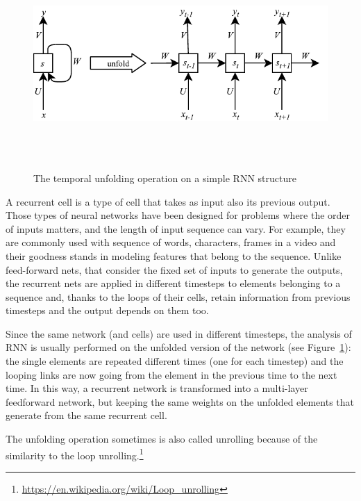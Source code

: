 \begin{figure}[!htbp]
    \centering
    \includegraphics[max width=\linewidth,max height=8cm,keepaspectratio]{figures/rnnUnfold}
    \caption{The temporal unfolding operation on a simple RNN structure}\label{fig:rnnUnfold}
\end{figure}

A recurrent cell is a type of cell that takes as input also its previous output. Those types of neural networks have been designed for problems where the order of inputs matters, and the length of input sequence can vary. For example, they are commonly used with sequence of words, characters, frames in a video and their goodness stands in modeling features that belong to the sequence. Unlike feed-forward nets, that consider the fixed set of inputs to generate the outputs, the recurrent nets are applied in different timesteps to elements belonging to a sequence and, thanks to the loops of their cells, retain information from previous timesteps and the output depends on them too.

Since the same network (and cells) are used in different timesteps, the analysis of RNN is usually performed on the unfolded version of the network (see Figure~\ref{fig:rnnUnfold}): the single elements are repeated different times (one for each timestep) and the looping links are now going from the element in the previous time to the next time. In this way, a recurrent network is transformed into a multi-layer feedforward network, but keeping the same weights on the unfolded elements that generate from the same recurrent cell.

The unfolding operation sometimes is also called unrolling because of the similarity to the loop unrolling.\footnote{\url{https://en.wikipedia.org/wiki/Loop\_unrolling}}

